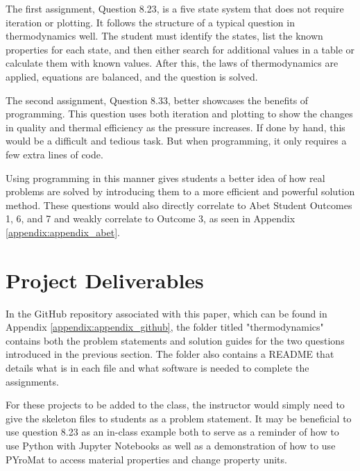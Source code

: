 The first assignment, Question 8.23, is a five state system that does not require iteration or plotting. It 
follows the structure of a typical question in thermodynamics well. The student must identify the states, list
the known properties for each state, and then either search for additional values in a table or calculate them 
with known values. After this, the laws of thermodynamics are applied, equations are balanced, and the question
is solved.

The second assignment, Question 8.33, better showcases the benefits of programming. This question uses both
iteration and plotting to show the changes in quality and thermal efficiency as the pressure increases. If 
done by hand, this would be a difficult and tedious task. But when programming, it only requires a few extra
lines of code.

Using programming in this manner gives students a better idea of how real problems are solved by introducing
them to a more efficient and powerful solution method. These questions would also directly correlate to Abet 
Student Outcomes 1, 6, and 7 and weakly correlate to Outcome 3, as seen in Appendix \ref{appendix:appendix_abet}.

\section{Project Deliverables}

In the GitHub repository associated with this paper, which can be found in Appendix \ref{appendix:appendix_github},
the folder titled "thermodynamics" contains both the problem statements and solution guides for the two questions
introduced in the previous section. The folder also contains a README that details what is in each file and 
what software is needed to complete the assignments. 

For these projects to be added to the class, the instructor would simply need to give the skeleton files to 
students as a problem statement. It may be beneficial to use question 8.23 as an in-class example both to serve 
as a reminder of how to use Python with Jupyter Notebooks as well as a demonstration of how to use PYroMat to 
access material properties and change property units.